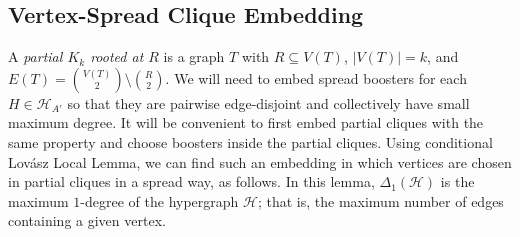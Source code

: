 \documentclass[11pt]{article}
\numberwithin{equation}{section}
\newcounter{i}
\theoremstyle{plain}
\theoremstyle{plain} %
\theoremstyle{definition}
\newcommand{\cH}{\mathcal{H}}
\begin{document}
\subsection{Vertex-Spread Clique Embedding}

A \textit{partial $K_k$ rooted at $R$} is a graph $T$ with $R \subseteq V(T)$, $|V(T)| = k$, and $E(T) = \binom{V(T)}{2}\setminus \binom{R}{2}$.
We will need to embed spread boosters for each $H \in \cH_{A'}$ so that they are pairwise edge-disjoint and collectively have small maximum degree.  It will be convenient to first embed partial cliques with the same property and choose boosters inside the partial cliques.  Using conditional Lov\'asz Local Lemma, we can find such an embedding in which vertices are chosen in partial cliques in a spread way, as follows.
In this lemma, $\Delta_1(\cH)$ is the maximum $1$-degree of the hypergraph $\cH$; that is, the maximum number of edges containing a given vertex.
\end{document}
